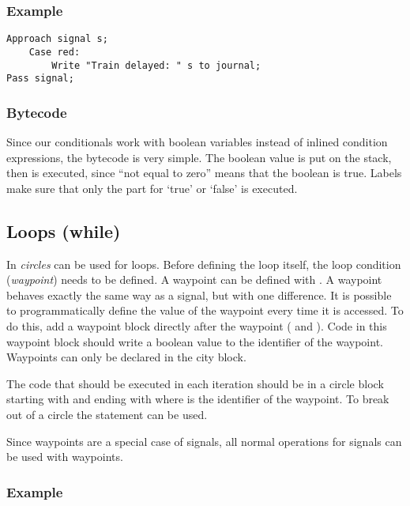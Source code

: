 \subsubsection*{Example}

\begin{lstlisting}
Approach signal s;
	Case red:
		Write "Train delayed: " s to journal;
Pass signal;
\end{lstlisting}

\subsubsection*{Bytecode}

Since our conditionals work with boolean variables instead of inlined condition expressions, the bytecode is very simple. The boolean value is put on the stack, then  is executed, since ``not equal to zero'' means that the boolean is true. Labels make sure that only the part for `true' or `false' is executed.

\subsection{Loops (while)}

In \shortname \emph{circles} can be used for loops. Before defining the loop itself, the loop condition (\emph{waypoint}) needs to be defined. A waypoint can be defined with . A waypoint behaves exactly the same way as a signal, but with one difference. It is possible to programmatically define the value of the waypoint every time it is accessed. To do this, add a waypoint block directly after the waypoint ( and ). Code in this waypoint block should write a boolean value to the identifier of the waypoint. Waypoints can only be declared in the  city block.

The code that should be executed in each iteration should be in a circle block starting with  and ending with  where  is the identifier of the waypoint. To break out of a circle the statement  can be used.

Since waypoints are a special case of signals, all normal operations for signals can be used with waypoints.

\subsubsection*{Example}

